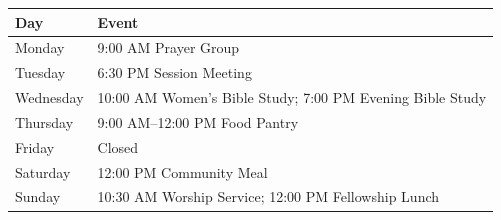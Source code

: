 \documentclass[
    language=english,
    doctype=liturgy,
    institution=none,
]{../../omnilatex}
\begin{document}
\begin{center}
\begin{tabular}{|l|l|}
\hline
\textbf{Day} & \textbf{Event} \\
\hline
Monday & 9:00 AM Prayer Group \\
\hline
Tuesday & 6:30 PM Session Meeting \\
\hline
Wednesday & 10:00 AM Women's Bible Study; 7:00 PM Evening Bible Study \\
\hline
Thursday & 9:00 AM--12:00 PM Food Pantry \\
\hline
Friday & Closed \\
\hline
Saturday & 12:00 PM Community Meal \\
\hline
Sunday & 10:30 AM Worship Service; 12:00 PM Fellowship Lunch \\
\hline
\end{tabular}
\end{center}
\end{document}
